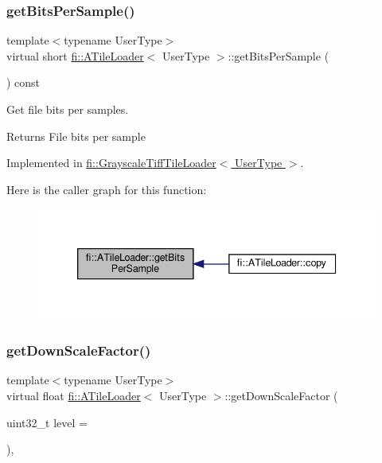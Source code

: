\subsubsection{\texorpdfstring{get\+Bits\+Per\+Sample()}{getBitsPerSample()}}
{\footnotesize\ttfamily template$<$typename User\+Type$>$ \\
virtual short \hyperlink{classfi_1_1ATileLoader}{fi\+::\+A\+Tile\+Loader}$<$ User\+Type $>$\+::get\+Bits\+Per\+Sample (\begin{DoxyParamCaption}{ }\end{DoxyParamCaption}) const\hspace{0.3cm}{\ttfamily [pure virtual]}}



Get file bits per samples. 

\begin{DoxyReturn}{Returns}
File bits per sample 
\end{DoxyReturn}


Implemented in \hyperlink{classfi_1_1GrayscaleTiffTileLoader_a80ae5ca350571d2c993a68d40bdc39c9}{fi\+::\+Grayscale\+Tiff\+Tile\+Loader$<$ User\+Type $>$}.

Here is the caller graph for this function\+:
\nopagebreak
\begin{figure}[H]
\begin{center}
\leavevmode
\includegraphics[width=339pt]{dc/d54/classfi_1_1ATileLoader_a20ce7ee013801a64dedc95c2a3b9be7f_icgraph}
\end{center}
\end{figure}
\mbox{\label{classfi_1_1ATileLoader_a07d565eeaa7076d905a329c80c1e980c}} 
\subsubsection{\texorpdfstring{get\+Down\+Scale\+Factor()}{getDownScaleFactor()}}
{\footnotesize\ttfamily template$<$typename User\+Type$>$ \\
virtual float \hyperlink{classfi_1_1ATileLoader}{fi\+::\+A\+Tile\+Loader}$<$ User\+Type $>$\+::get\+Down\+Scale\+Factor (\begin{DoxyParamCaption}\item[{uint32\+\_\+t}]{level = {} }\end{DoxyParamCaption})\hspace{0.3cm}{\ttfamily [inline]}, {\ttfamily [virtual]}}



